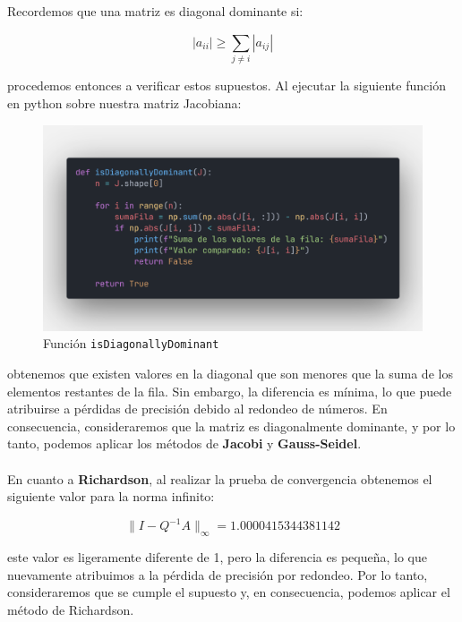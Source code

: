 \documentclass{article}
\begin{document}
  \paragraph{}
  Recordemos que una matriz es diagonal dominante si:

  \[
  |a_{ii}| \geq \sum_{j \neq i}^{} |a_{ij}|
  \]

  procedemos entonces a verificar estos supuestos. Al ejecutar la siguiente función en python sobre nuestra matriz Jacobiana:

  \begin{figure}[H]
      \centering
      \includegraphics[width=1\textwidth]{DiagDom.png}
      \caption{Función \texttt{isDiagonallyDominant}}
  \end{figure}

  obtenemos que existen valores en la diagonal que son menores que la suma de los elementos restantes de la fila. Sin embargo, la diferencia es mínima, lo que puede atribuirse a pérdidas de precisión debido al redondeo de números. En consecuencia, consideraremos que la matriz es diagonalmente dominante, y por lo tanto, podemos aplicar los métodos de \textbf{Jacobi} y \textbf{Gauss-Seidel}.

  \paragraph{}
  En cuanto a \textbf{Richardson}, al realizar la prueba de convergencia obtenemos el siguiente valor para la norma infinito:

  \[
  \|I-Q^{-1}A\|_\infty = 1.0000415344381142
  \]

  este valor es ligeramente diferente de 1, pero la diferencia es pequeña, lo que nuevamente atribuimos a la pérdida de precisión por redondeo. Por lo tanto, consideraremos que se cumple el supuesto y, en consecuencia, podemos aplicar el método de Richardson.
\end{document}
